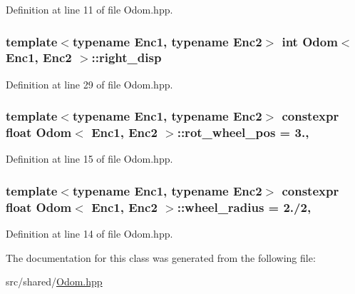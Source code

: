 Definition at line 11 of file Odom.\-hpp.

\hypertarget{classOdom_a967a8ce7e6bea53de203e37cf180389a}{
\subsubsection[{right\-\_\-disp}]{\setlength{\rightskip}{0pt plus 5cm}template$<$typename Enc1, typename Enc2$>$ int {\bf Odom}$<$ Enc1, Enc2 $>$\-::right\-\_\-disp}}\label{classOdom_a967a8ce7e6bea53de203e37cf180389a}


Definition at line 29 of file Odom.\-hpp.

\hypertarget{classOdom_a3d72db210126e10ebcae996e1e707ce5}{
\subsubsection[{rot\-\_\-wheel\-\_\-pos}]{\setlength{\rightskip}{0pt plus 5cm}template$<$typename Enc1, typename Enc2$>$ constexpr float {\bf Odom}$<$ Enc1, Enc2 $>$\-::rot\-\_\-wheel\-\_\-pos = 3.\hspace{0.3cm}{\ttfamily [static]}, {\ttfamily [private]}}}\label{classOdom_a3d72db210126e10ebcae996e1e707ce5}


Definition at line 15 of file Odom.\-hpp.

\hypertarget{classOdom_a567d0fcf68e65948aed27f27f35e6973}{
\subsubsection[{wheel\-\_\-radius}]{\setlength{\rightskip}{0pt plus 5cm}template$<$typename Enc1, typename Enc2$>$ constexpr float {\bf Odom}$<$ Enc1, Enc2 $>$\-::wheel\-\_\-radius = 2./2\hspace{0.3cm}{\ttfamily [static]}, {\ttfamily [private]}}}\label{classOdom_a567d0fcf68e65948aed27f27f35e6973}


Definition at line 14 of file Odom.\-hpp.



The documentation for this class was generated from the following file\-:\begin{DoxyCompactItemize}
\item 
src/shared/\hyperlink{Odom_8hpp}{Odom.\-hpp}\end{DoxyCompactItemize}
